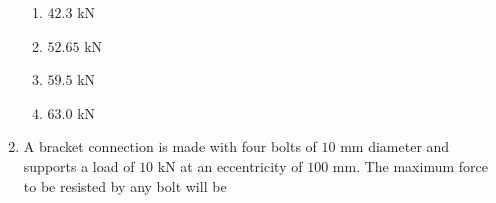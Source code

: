 \documentclass[journal,12pt,onecolumn]{IEEEtran}
\theoremstyle{remark}
\begin{document}
\begin{enumerate}[start=35]
                  \begin{enumerate}
			  \item $42.3$ kN
			  \item $52.65$ kN
			  \item $59.5$ kN
			  \item $63.0$ kN\\
		  \end{enumerate}
	  \item A bracket connection is made with four bolts of $10$ mm diameter and supports a load of $10$ kN at an eccentricity of $100$ mm. The maximum force to be resisted by any bolt will be \\
\begin{figure}[H]
    \centering
\end{figure}


\end{enumerate}
\end{document}

